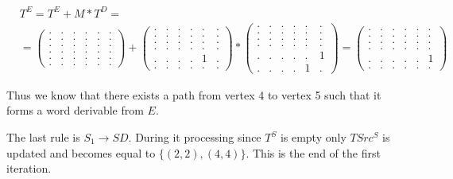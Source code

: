 {
    \renewcommand{\arraystretch}{0.7}
    \setlength\arraycolsep{2pt}
\begin{align*}
&T^E = T^E + M * T^D = \\ &=
\begin{pmatrix}
    . & . & . & . & . & . \\
    . & . & . & . & . & . \\
    . & . & . & . & . & . \\
    . & . & . & . & . & . \\ 
    . & . & . & . & . & . \\ 
    . & . & . & . & . & .
\end{pmatrix}+
\begin{pmatrix}
    . & . & . & . & . & . \\
    . & . & . & . & . & . \\
    . & . & . & . & . & . \\
    . & . & . & . & . & . \\ 
    . & . & . & . & 1 & . \\ 
    . & . & . & . & . & .
\end{pmatrix}* 
\begin{pmatrix}
    . & . & . & . & . & . \\
    . & . & . & . & . & . \\
    . & . & . & . & . & . \\
    . & . & . & . & . & . \\ 
    . & . & . & . & . & 1 \\ 
    . & . & . & . & 1 & .
\end{pmatrix}=
\begin{pmatrix}
    . & . & . & . & . & . \\
    . & . & . & . & . & . \\
    . & . & . & . & . & . \\
    . & . & . & . & . & . \\ 
    . & . & . & . & . & 1 \\ 
    . & . & . & . & . & .
\end{pmatrix}
\end{align*}
}

Thus we know that there exists a path from vertex 4 to vertex 5 such that it forms a word derivable from $E$.

The last rule is $S_1 \to S D$.
During it processing since $T^S$ is empty only $TSrc^S$ is updated and becomes equal to $\{(2, 2), (4, 4)\}$.
This is the end of the first iteration.

